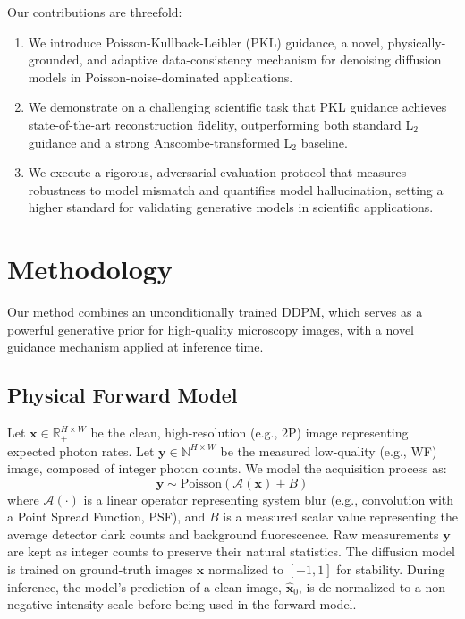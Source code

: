 \documentclass{article}
\newcommand{\wf}{WF\xspace}
\newcommand{\twop}{2P\xspace}
\begin{document}
Our contributions are threefold:
\begin{enumerate}
    \item We introduce Poisson-Kullback-Leibler (PKL) guidance, a novel, physically-grounded, and adaptive data-consistency mechanism for denoising diffusion models in Poisson-noise-dominated applications.
    \item We demonstrate on a challenging scientific task that PKL guidance achieves state-of-the-art reconstruction fidelity, outperforming both standard L$_2$ guidance and a strong Anscombe-transformed L$_2$ baseline.
    \item We execute a rigorous, adversarial evaluation protocol that measures robustness to model mismatch and quantifies model hallucination, setting a higher standard for validating generative models in scientific applications.
\end{enumerate}


\section{Methodology}
\label{sec:methodology}
Our method combines an unconditionally trained DDPM, which serves as a powerful generative prior for high-quality microscopy images, with a novel guidance mechanism applied at inference time.

\subsection{Physical Forward Model}
Let $\mathbf{x} \in \mathbb{R}_+^{H \times W}$ be the clean, high-resolution (e.g., \twop) image representing expected photon rates. Let $\mathbf{y} \in \mathbb{N}^{H \times W}$ be the measured low-quality (e.g., \wf) image, composed of integer photon counts. We model the acquisition process as:
\begin{equation}
\mathbf{y} \sim \text{Poisson}(\mathcal{A}(\mathbf{x}) + B)
\end{equation}
where $\mathcal{A}(\cdot)$ is a linear operator representing system blur (e.g., convolution with a Point Spread Function, PSF), and $B$ is a measured scalar value representing the average detector dark counts and background fluorescence. Raw measurements $\mathbf{y}$ are kept as integer counts to preserve their natural statistics. The diffusion model is trained on ground-truth images $\mathbf{x}$ normalized to $[-1,1]$ for stability. During inference, the model's prediction of a clean image, $\mathbf{\hat{x}}_0$, is de-normalized to a non-negative intensity scale before being used in the forward model.
\end{document}
